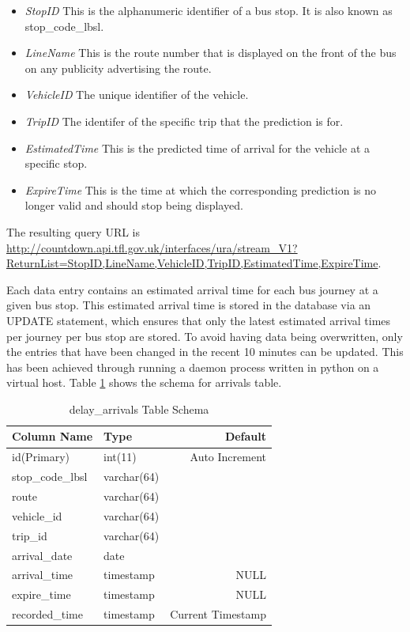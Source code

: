 \begin{itemize}
  \item \textit{StopID} This is the alphanumeric identifier of a bus stop. It is also known as stop\_code\_lbsl.
  \item \textit{LineName} This is the route number that is displayed on the front of the bus on any publicity advertising the route.
  \item \textit{VehicleID} The unique identifier of the vehicle.
  \item \textit{TripID} The identifer of the specific trip that the prediction is for.
  \item \textit{EstimatedTime} This is the predicted time of arrival for the vehicle at a specific stop.
  \item \textit{ExpireTime} This is the time at which the corresponding prediction is no longer valid and should stop being displayed.
\end{itemize}

\par The resulting query URL is \sloppy \url{http://countdown.api.tfl.gov.uk/interfaces/ura/stream_V1?ReturnList=StopID,LineName,VehicleID,TripID,EstimatedTime,ExpireTime}.

\par Each data entry contains an estimated arrival time for each bus journey at a given bus stop. This estimated arrival time is stored in the database via an UPDATE statement, which ensures that only the latest estimated arrival times per journey per bus stop are stored. To avoid having data being overwritten, only the entries that have been changed in the recent 10 minutes can be updated. This has been achieved through running a daemon process written in python on a virtual host. Table \ref{table:delay_arrivals_schema} shows the schema for arrivals table.

\begin{table}
\centering
\begin{tabular}{@{}llr@{}} \toprule
Column Name & Type & Default \\ \midrule
id(Primary) & int(11) & Auto Increment \\
stop\_code\_lbsl & varchar(64) &  \\
route & varchar(64) &  \\
vehicle\_id & varchar(64) & \\
trip\_id & varchar(64) & \\
arrival\_date & date &  \\
arrival\_time & timestamp & NULL \\
expire\_time & timestamp & NULL \\
recorded\_time & timestamp & Current Timestamp \\ \bottomrule
\end{tabular}
\caption{delay\_arrivals Table Schema}
\label{table:delay_arrivals_schema}
\end{table}


